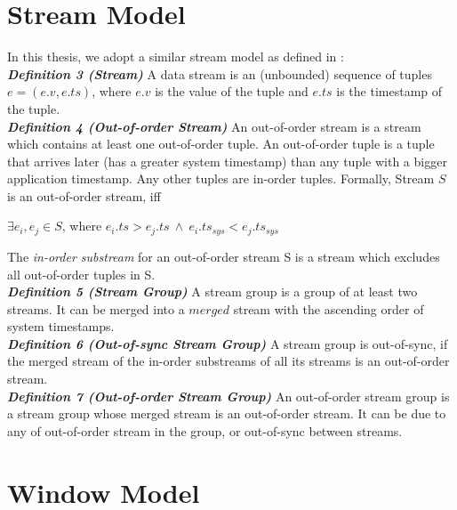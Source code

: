 \documentclass[a4paper, 11pt, twoside]{report}
\begin{document}
\section{Stream Model}

In this thesis, we adopt a similar stream model as defined in \cite{Cormode:2008:TAO:1376916.1376930}:\\

\textbf{\textit{Definition 3 (Stream)}} A data stream is an (unbounded) sequence of tuples $e = (e.v, e.ts)$, where $e.v$ is the value of the tuple and $e.ts$ is the timestamp of the tuple.\\

\textbf{\textit{Definition 4 (Out-of-order Stream)}} An out-of-order stream is a stream which contains at least one out-of-order tuple. An out-of-order tuple is a tuple that arrives later (has a greater system timestamp) than any tuple with a bigger application timestamp. Any other tuples are in-order tuples. Formally, Stream $S$ is an out-of-order stream, iff
\begin{center}
$\exists e_i, e_j \in S$, where $e_i.ts > e_j.ts\ \wedge\ e_i.ts_{sys} < e_j.ts_{sys}$\\
\end{center}

The \textit{in-order substream} for an out-of-order stream S is a stream which excludes all out-of-order tuples in S.\\

\textbf{\textit{Definition 5 (Stream Group)}} A stream group is a group of at least two streams. It can be merged into a $merged$ stream with the ascending order of system timestamps.\\

\textbf{\textit{Definition 6 (Out-of-sync Stream Group)}} A stream group is out-of-sync, if the merged stream of the in-order substreams of all its streams is an out-of-order stream.\\

\textbf{\textit{Definition 7 (Out-of-order Stream Group)}} An out-of-order stream group is a stream group whose merged stream is an out-of-order stream. It can be due to any of out-of-order stream in the group, or out-of-sync between streams.\\

\section{Window Model}
\end{document}
